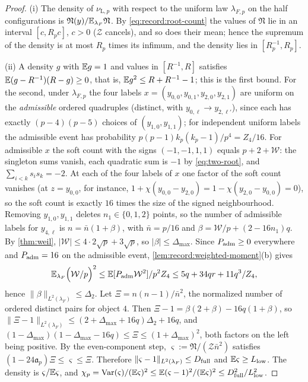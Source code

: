 \begin{proof}
(i) The density of $\nu_{\mathrm L,p}$ with respect to the uniform law
$\lambda_{F,p}$ on the half configurations is $\mathfrak N(y)/
\mathbb E_{\lambda_F}\mathfrak N$. By \eqref{eq:record:root-count} the values of
$\mathfrak N$ lie in an interval $[c,R_pc]$, $c>0$ ($\mathcal Z$ cancels), and so
does their mean; hence the supremum of the density is at most $R_p$ times its
infimum, and the density lies in $[R_p^{-1},R_p]$.

(ii) A density $g$ with $\mathbb E g=1$ and values in $[R^{-1},R]$ satisfies
$\mathbb E(g-R^{-1})(R-g)\ge0$, that is, $\mathbb E g^2\le R+R^{-1}-1$; this is the first
bound. For the second, under $\lambda_{F,p}$ the four labels
$x=(y_{0,0},y_{0,1},y_{2,0},y_{2,1})$ are uniform on the \emph{admissible}
ordered quadruples (distinct, with $y_{0,\ell}\to y_{2,\ell'}$), since each has
exactly $(p-4)(p-5)$ choices of $(y_{1,0},y_{1,1})$; for independent uniform
labels the admissible event has probability $p(p-1)k_p(k_p-1)/p^4=Z_4/16$. For
admissible $x$ the soft count with the signs $(-1,-1,1,1)$ equals
$p+2+\mathcal W$: the singleton sums vanish, each quadratic sum is $-1$
by \eqref{eq:two-root}, and $\sum_{i<k}s_is_k=-2$. At each of the four labels of
$x$ one factor of the soft count vanishes (at $z=y_{0,0}$, for instance,
$1+\chi(y_{0,0}-y_{2,0})=1-\chi(y_{2,0}-y_{0,0})=0$), so the soft count is exactly
$16$ times the size of the signed neighbourhood. Removing $y_{1,0},y_{1,1}$
deletes $n_1\in\{0,1,2\}$ points, so the number of admissible labels for
$y_{4,\ell}$ is $n=\bar n(1+\beta)$, with $\bar n=p/16$ and
$\beta=\mathcal W/p+(2-16n_1)q$. By \cref{thm:weil},
$|\mathcal W|\le4\cdot2\sqrt p+3\sqrt p$, so $|\beta|\le\Delta_{\max}$. Since
$P_{\rm adm}\ge0$ everywhere and $P_{\rm adm}=16$ on the admissible event,
\cref{lem:record:weighted-moment}(b) gives
\[
 \mathbb E_{\lambda_F}\Bigl(\mathcal W/p\Bigr)^2\le
 \mathbb E[P_{\rm adm}\mathcal W^2]/p^2Z_4
 \le5q+34qr+11q^3/Z_4,
\]
hence $\|\beta\|_{L^2(\lambda_F)}\le\Delta_2$. Let $\Xi=n(n-1)/\bar n^2$, the
normalized number of ordered distinct pairs for object $4$. Then
$\Xi-1=\beta(2+\beta)-16q(1+\beta)$, so
$\|\Xi-1\|_{L^2(\lambda_F)}\le(2+\Delta_{\max}+16q)\Delta_2+16q$, and
$(1-\Delta_{\max})(1-\Delta_{\max}-16q)\le\Xi\le(1+\Delta_{\max})^2$, both factors on
the left being positive. By the
even-component step, $\varsigma:=\mathfrak N/(\mathcal Z\bar n^2)$ satisfies
$(1-24\mathfrak a_p)\Xi\le\varsigma\le\Xi$. Therefore
$\|\varsigma-1\|_{L^2(\lambda_F)}\le D_{\rm full}$ and $\mathbb E\varsigma\ge L_{\rm low}$.
The density is $\varsigma/\mathbb E\varsigma$, and
$\chi_p=\operatorname{Var}(\varsigma)/(\mathbb E\varsigma)^2\le\mathbb E(\varsigma-1)^2/(\mathbb E\varsigma)^2\le
D_{\rm full}^2/L_{\rm low}^2$.


\end{proof}

